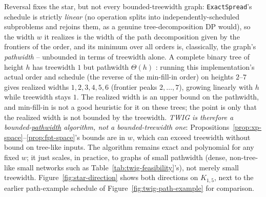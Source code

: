 \documentclass[11pt]{article}
\theoremstyle{definition}
\theoremstyle{remark}
\begin{document}
Reversal fixes the star, but not every bounded-treewidth graph:
\texttt{ExactSpread}'s schedule is strictly \emph{linear} (no operation
splits into independently-scheduled subproblems and rejoins them, as a
genuine tree-decomposition DP would), so the width $w$ it realizes is
the width of the path decomposition given by the frontiers of the order, and its minimum
over all orders is, classically, the graph's \emph{pathwidth}
\citep{kinnersley1992} -- unbounded in terms of treewidth alone. A
complete binary tree of height $h$ has treewidth $1$ but pathwidth
$\Theta(h)$ \citep{kinnersley1992}: running this implementation's actual
order and schedule (the reverse of the min-fill-in order) on heights
$2$--$7$ gives realized widths $1,2,3,4,5,6$ (frontier peaks $2,\dots,7$), growing linearly with $h$ while treewidth stays $1$. The realized width is an upper bound on the pathwidth, and min-fill-in is not a good heuristic for it on these trees; the point is only that the realized width is not bounded by the treewidth. \emph{TWIG is therefore a
bounded-\underline{pathwidth} algorithm, not a bounded-treewidth one}:
Propositions~\ref{prop:xp-space}--\ref{prop:fpt-space}'s bounds are in
$w$, which can exceed treewidth without bound on tree-like inputs. The
algorithm remains exact and polynomial for any fixed $w$; it just scales,
in practice, to graphs of small pathwidth (dense, non-tree-like small
networks such as Table~\ref{tab:twig-feasibility}'s), not merely small
treewidth.
Figure~\ref{fig:star-direction} shows both directions on $K_{1,5}$, next
to the earlier path-example schedule of Figure~\ref{fig:twig-path-example}
for comparison.
\end{document}
